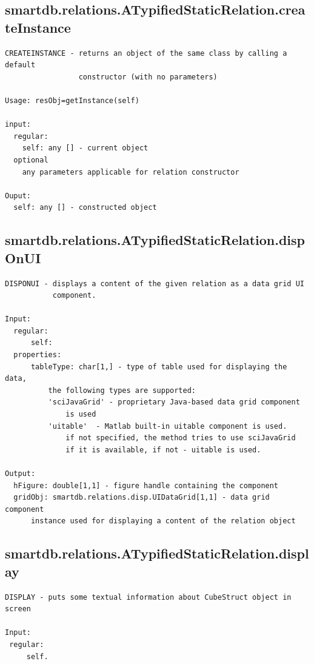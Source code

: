 \documentclass[letterpaper,10pt,english]{sphinxmanual}
\begin{document}
\subsection{smartdb.relations.ATypifiedStaticRelation.createInstance}
\label{chap_functions:smartdb-relations-atypifiedstaticrelation-createinstance}
\begin{Verbatim}[commandchars=\\\{\}]
CREATEINSTANCE - returns an object of the same class by calling a default
                 constructor (with no parameters)

Usage: resObj=getInstance(self)

input:
  regular:
    self: any [] - current object
  optional
    any parameters applicable for relation constructor

Ouput:
  self: any [] - constructed object
\end{Verbatim}


\subsection{smartdb.relations.ATypifiedStaticRelation.dispOnUI}
\label{chap_functions:smartdb-relations-atypifiedstaticrelation-disponui}
\begin{Verbatim}[commandchars=\\\{\}]
DISPONUI - displays a content of the given relation as a data grid UI
           component.

Input:
  regular:
      self:
  properties:
      tableType: char[1,] - type of table used for displaying the data,
          the following types are supported:
          'sciJavaGrid' - proprietary Java-based data grid component
              is used
          'uitable'  - Matlab built-in uitable component is used.
              if not specified, the method tries to use sciJavaGrid
              if it is available, if not - uitable is used.

Output:
  hFigure: double[1,1] - figure handle containing the component
  gridObj: smartdb.relations.disp.UIDataGrid[1,1] - data grid component
      instance used for displaying a content of the relation object
\end{Verbatim}


\subsection{smartdb.relations.ATypifiedStaticRelation.display}
\label{chap_functions:smartdb-relations-atypifiedstaticrelation-display}
\begin{Verbatim}[commandchars=\\\{\}]
DISPLAY - puts some textual information about CubeStruct object in screen

Input:
 regular:
     self.
\end{Verbatim}
\end{document}
